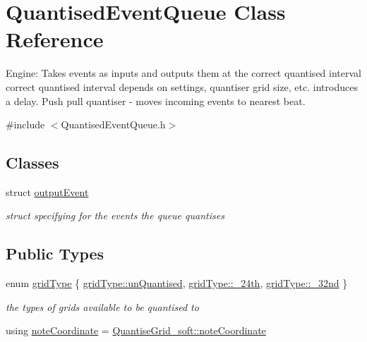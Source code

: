 \hypertarget{classQuantisedEventQueue}{}\section{Quantised\+Event\+Queue Class Reference}
\label{classQuantisedEventQueue}


Engine\+: Takes events as inputs and outputs them at the correct quantised interval correct quantised interval depends on settings, quantiser grid size, etc. introduces a delay. Push pull quantiser -\/ moves incoming events to nearest beat.  




{\ttfamily \#include $<$Quantised\+Event\+Queue.\+h$>$}

\subsection*{Classes}
\begin{DoxyCompactItemize}
\item 
struct \mbox{\hyperlink{structQuantisedEventQueue_1_1outputEvent}{output\+Event}}
\begin{DoxyCompactList}\small\item\em struct specifying for the events the queue quantises \end{DoxyCompactList}\end{DoxyCompactItemize}
\subsection*{Public Types}
\begin{DoxyCompactItemize}
\item 
enum \mbox{\hyperlink{classQuantisedEventQueue_ae186d50bd503038452edbbdd0c7c259e}{grid\+Type}} \{ \mbox{\hyperlink{classQuantisedEventQueue_ae186d50bd503038452edbbdd0c7c259eac4f7d29e17ae6df87548a7e5a5dc94d6}{grid\+Type\+::un\+Quantised}}, 
\mbox{\hyperlink{classQuantisedEventQueue_ae186d50bd503038452edbbdd0c7c259ea4166cc8b14a93b3920f09fcebbfa435a}{grid\+Type\+::\+\_\+24th}}, 
\mbox{\hyperlink{classQuantisedEventQueue_ae186d50bd503038452edbbdd0c7c259eac9582d52391fa58d898a389301076561}{grid\+Type\+::\+\_\+32nd}}
 \}
\begin{DoxyCompactList}\small\item\em the types of grids available to be quantised to \end{DoxyCompactList}\item 
using \mbox{\hyperlink{classQuantisedEventQueue_a7e4af70d71f881cb31e643f59c6cf6e6}{note\+Coordinate}} = \mbox{\hyperlink{structQuantiseGrid__soft_1_1noteCoordinate}{Quantise\+Grid\+\_\+soft\+::note\+Coordinate}}
\end{DoxyCompactItemize}
